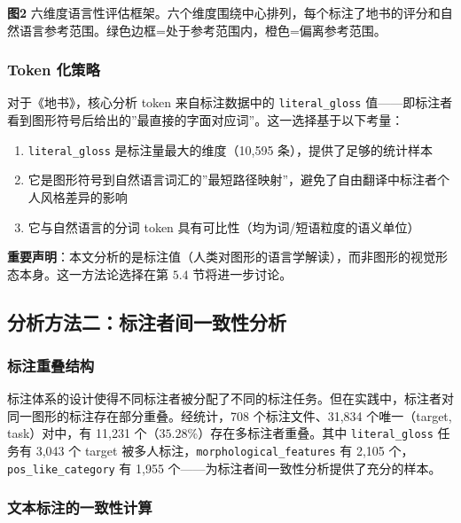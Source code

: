 \documentclass[12pt,a4paper,UTF8,fontset=founder]{ctexart}
\begin{document}
\textbf{图2} 六维度语言性评估框架。六个维度围绕中心排列，每个标注了地书的评分和自然语言参考范围。绿色边框=处于参考范围内，橙色=偏离参考范围。

\subsubsection{Token 化策略}\label{token-ux5316ux7b56ux7565}

对于《地书》，核心分析 token 来自标注数据中的 \texttt{literal\_gloss} 值------即标注者看到图形符号后给出的''最直接的字面对应词''。这一选择基于以下考量：

\begin{enumerate}
\def\labelenumi{\arabic{enumi}.}

\item
  \texttt{literal\_gloss} 是标注量最大的维度（10,595 条），提供了足够的统计样本
\item
  它是图形符号到自然语言词汇的''最短路径映射''，避免了自由翻译中标注者个人风格差异的影响
\item
  它与自然语言的分词 token 具有可比性（均为词/短语粒度的语义单位）
\end{enumerate}

\textbf{重要声明}：本文分析的是标注值（人类对图形的语言学解读），而非图形的视觉形态本身。这一方法论选择在第 $5.4$ 节将进一步讨论。

\subsection{分析方法二：标注者间一致性分析}\label{ux5206ux6790ux65b9ux6cd5ux4e8cux6807ux6ce8ux8005ux95f4ux4e00ux81f4ux6027ux5206ux6790}

\subsubsection{标注重叠结构}\label{ux6807ux6ce8ux91cdux53e0ux7ed3ux6784}

标注体系的设计使得不同标注者被分配了不同的标注任务。但在实践中，标注者对同一图形的标注存在部分重叠。经统计，708 个标注文件、31,834 个唯一（target, task）对中，有 11,231 个（$35.28$\%）存在多标注者重叠。其中 \texttt{literal\_gloss} 任务有 3,043 个 target 被多人标注，\texttt{morphological\_features} 有 2,105 个，\texttt{pos\_like\_category} 有 1,955 个------为标注者间一致性分析提供了充分的样本。

\subsubsection{文本标注的一致性计算}\label{ux6587ux672cux6807ux6ce8ux7684ux4e00ux81f4ux6027ux8ba1ux7b97}
\end{document}

